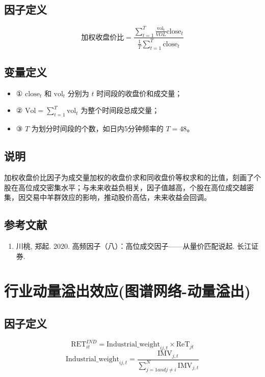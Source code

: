 \documentclass{article}
\begin{document}
\subsection{因子定义}

\begin{equation}
    \text{加权收盘价比} = \frac{\sum_{t=1}^T \frac{\mathrm{vol}_t}{VOL}\mathrm{close}_t }{\frac{1}{T} \sum_{t=1}^T \mathrm{close}_t}
\end{equation}

\subsection{变量定义}
\begin{itemize}
    \item ① \(\mathrm{close}_t\) 和 \(\mathrm{vol}_t\) 分别为 \(t\) 时间段的收盘价和成交量；
    \item ② \(\mathrm{Vol} = \sum^{T}_{t=1} \mathrm{vol}_t\) 为整个时间段总成交量；
    \item ③ \(T\) 为划分时间段的个数，如日内5分钟频率的 \(T=48\)。
\end{itemize}

\subsection{说明}
加权收盘价比因子为成交量加权的收盘价求和同收盘价等权求和的比值，刻画了个股在高位成交密集水平；与未来收益负相关，因子值越高，个股在高位成交越密集，因交易中羊群效应的影响，推动股价高估，未来收益会回调。

\subsection{参考文献}
\begin{enumerate}
    \item 川桃, 郑起. 2020. 高频因子（八）：高位成交因子——从量价匹配说起. 长江证券.
\end{enumerate}

\section{行业动量溢出效应(图谱网络-动量溢出)}

\subsection{因子定义}
\begin{equation}
    \mathrm{RET}^{IND}_{it} =  \mathrm{Industrial\_weight}_{ij,t} \times \mathrm{ReT}_{jt}
\end{equation}
\begin{equation}
    \mathrm{Industrial\_weight}_{ij,t} = \frac{\mathrm{IMV}_{j,t}}{\sum_{j=1 and j \neq i}^N \mathrm{IMV}_{j,t}}
\end{equation}
\end{document}

